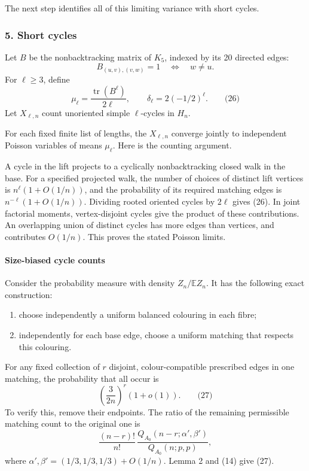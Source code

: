 \documentclass[
  11pt,
  a4paper,
]{article}
\providecommand{\tightlist}{%
  \setlength{\itemsep}{0pt}\setlength{\parskip}{0pt}}
\begin{document}
The next step identifies all of this limiting variance with short
cycles.

\subsubsection{5. Short cycles}\label{short-cycles}

Let \(B\) be the nonbacktracking matrix of \(K_5\), indexed by its 20
directed edges: \[
B_{(u,v),(v,w)}=1\quad\Longleftrightarrow\quad w\ne u.
\] For \(\ell\ge3\), define \[
\mu_\ell=\frac{\operatorname{tr}(B^\ell)}{2\ell},
\qquad
\delta_\ell=2(-1/2)^\ell.                                      \qquad\text{(26)}
\] Let \(X_{\ell,n}\) count unoriented simple \(\ell\)-cycles in
\(H_n\).

For each fixed finite list of lengths, the \(X_{\ell,n}\) converge
jointly to independent Poisson variables of means \(\mu_\ell\). Here is
the counting argument.

A cycle in the lift projects to a cyclically nonbacktracking closed walk
in the base. For a specified projected walk, the number of choices of
distinct lift vertices is \(n^\ell(1+O(1/n))\), and the probability of
its required matching edges is \(n^{-\ell}(1+O(1/n))\). Dividing rooted
oriented cycles by \(2\ell\) gives (26). In joint factorial moments,
vertex-disjoint cycles give the product of these contributions. An
overlapping union of distinct cycles has more edges than vertices, and
contributes \(O(1/n)\). This proves the stated Poisson limits.

\paragraph{Size-biased cycle counts}\label{size-biased-cycle-counts}

Consider the probability measure with density \(Z_n/\mathbb E Z_n\). It
has the following exact construction:

\begin{enumerate}
\def\labelenumi{\arabic{enumi}.}
\tightlist
\item
  choose independently a uniform balanced colouring in each fibre;
\item
  independently for each base edge, choose a uniform matching that
  respects this colouring.
\end{enumerate}

For any fixed collection of \(r\) disjoint, colour-compatible prescribed
edges in one matching, the probability that all occur is \[
\left(\frac{3}{2n}\right)^r(1+o(1)).                            \qquad\text{(27)}
\] To verify this, remove their endpoints. The ratio of the remaining
permissible matching count to the original one is \[
\frac{(n-r)!}{n!}\,
\frac{Q_{A_0}(n-r;\alpha',\beta')}
     {Q_{A_0}(n;p,p)},
\] where \(\alpha',\beta'=(1/3,1/3,1/3)+O(1/n)\). Lemma 2 and (14) give
(27).
\end{document}
